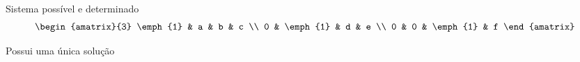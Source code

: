 \begin{question}
  Sistema possível e determinado
  \[
    \begin{amatrix}{3}
      \emph{1} & a        & b        & c \\
      0        & \emph{1} & d        & e \\
      0        & 0        & \emph{1} & f
    \end{amatrix}
  \]

  \pause
  Possui uma única solução
\end{question}
